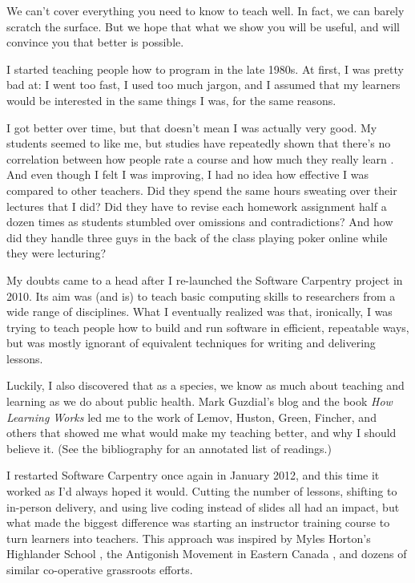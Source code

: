 We can't cover everything you need to know to teach well.  In fact,
we can barely scratch the surface.  But we hope that what we show you
will be useful, and will convince you that better is possible.


I started teaching people how to program in the late 1980s.  At first,
I was pretty bad at: I went too fast, I used too much jargon, and I
assumed that my learners would be interested in the same things I was,
for the same reasons.

I got better over time, but that doesn't mean I was actually very
good.  My students seemed to like me, but studies have repeatedly
shown that there's no correlation between how people rate a course and
how much they really learn \cite{fixme}.  And even though I felt I was
improving, I had no idea how effective I was compared to other
teachers.  Did they spend the same hours sweating over their lectures
that I did?  Did they have to revise each homework assignment half a
dozen times as students stumbled over omissions and contradictions?
And how did they handle three guys in the back of the class playing
poker online while they were lecturing?

My doubts came to a head after I re-launched the Software Carpentry
project in 2010.  Its aim was (and is) to teach basic computing skills
to researchers from a wide range of disciplines.  What I eventually
realized was that, ironically, I was trying to teach people how to
build and run software in efficient, repeatable ways, but was mostly
ignorant of equivalent techniques for writing and delivering lessons.

Luckily, I also discovered that as a species, we know as much about
teaching and learning as we do about public health.  Mark Guzdial's
blog \cite{fixme} and the book \emph{How Learning Works} \cite{fixme}
led me to the work of Lemov, Huston, Green, Fincher, and others that
showed me what would make my teaching better, and why I should believe
it.  (See the bibliography for an annotated list of readings.)

I restarted Software Carpentry once again in January 2012, and this
time it worked as I'd always hoped it would.  Cutting the number of
lessons, shifting to in-person delivery, and using live coding instead
of slides all had an impact, but what made the biggest difference was
starting an instructor training course to turn learners into teachers.
This approach was inspired by Myles Horton's Highlander School
\cite{fixme}, the Antigonish Movement in Eastern Canada \cite{fixme},
and dozens of similar co-operative grassroots efforts.

